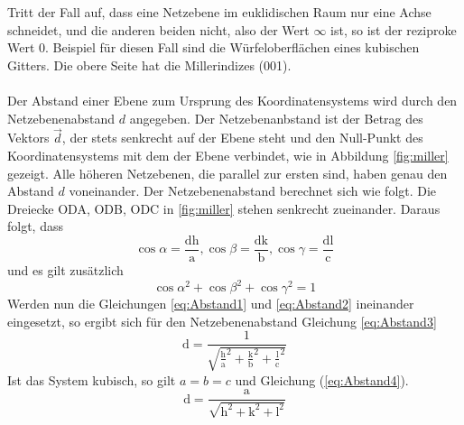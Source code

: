 Tritt der Fall auf, dass eine Netzebene im euklidischen Raum nur eine Achse schneidet, und die anderen beiden nicht, also der Wert $\infty$ ist, so ist der reziproke Wert 0. 
Beispiel für diesen Fall sind die Würfeloberflächen eines kubischen Gitters. 
Die obere Seite hat die Millerindizes (001).\\\\
Der Abstand einer Ebene zum Ursprung des Koordinatensystems wird durch den Netzebenenabstand $d$ angegeben.
Der Netzebenanbstand ist der Betrag des Vektors $\vec{d}$, der stets senkrecht auf der Ebene steht und den Null-Punkt des Koordinatensystems mit dem der Ebene verbindet, wie in Abbildung \ref{fig:miller} gezeigt.
Alle höheren Netzebenen, die parallel zur ersten sind, haben genau den Abstand $d$ voneinander.
Der Netzebenenabstand berechnet sich wie folgt.
Die Dreiecke ODA, ODB, ODC in \ref{fig:miller} stehen senkrecht zueinander. Daraus folgt, dass
\begin{equation}
\cos{\alpha} = \frac{\text{d}\text{h}}{\text{a}}, \cos{\beta} = \frac{\text{d}\text{k}}{\text{b}}, \cos{\gamma} = \frac{\text{d}\text{l}}{\text{c}}
\label{eq:Abstand1}
\end{equation}
 und es gilt zusätzlich
\begin{equation}
\cos{\alpha}^2+\cos{\beta}^2+\cos{\gamma}^2 = 1
\label{eq:Abstand2}
\end{equation}
Werden nun die Gleichungen \ref{eq:Abstand1} und \ref{eq:Abstand2} ineinander eingesetzt, so ergibt sich für den Netzebenenabstand Gleichung \ref{eq:Abstand3}
\begin{equation}
\text{d} = \frac{1}{\sqrt{\frac{\text{h}}{\text{a}}^2+\frac{\text{k}}{\text{b}}^2+\frac{\text{l}}{\text{c}}^2}}
\label{eq:Abstand3}
\end{equation}
Ist das System kubisch, so gilt $a = b = c$ und Gleichung (\ref{eq:Abstand4}).
\begin{equation}
\text{d} = \frac{\text{a}}{\sqrt{\text{h}^2+\text{k}^2+\text{l}^2}}
\label{eq:Abstand4}
\end{equation}

